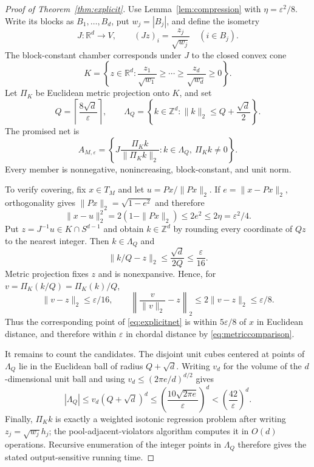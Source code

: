 \documentclass[11pt]{article}
\newcommand{\R}{\mathbb R}
\begin{document}
\begin{proof}[Proof of Theorem~\ref{thm:explicit}]
Use Lemma~\ref{lem:compression} with $\eta=\varepsilon^2/8$.  Write its blocks
as $B_1,\ldots,B_d$, put $w_j=|B_j|$, and define the isometry
\[
 J:\R^d\longrightarrow V,
 \qquad (Jz)_i=\frac{z_j}{\sqrt{w_j}}\quad(i\in B_j).
\]
The block-constant chamber corresponds under $J$ to the closed convex cone
\[
 K=\left\{z\in\R^d:
 \frac{z_1}{\sqrt{w_1}}\geq\cdots\geq
 \frac{z_d}{\sqrt{w_d}}\geq0\right\}.
\]
Let $\Pi_K$ be Euclidean metric projection onto $K$, and set
\[
 Q=\left\lceil\frac{8\sqrt d}{\varepsilon}\right\rceil,
 \qquad
 \Lambda_Q=\left\{k\in\mathbb Z^d:
 \|k\|_2\leq Q+\frac{\sqrt d}{2}\right\}.
\]
The promised net is
\begin{equation}\label{eq:explicitnet}
 A_{M,\varepsilon}
 =\left\{
 J\frac{\Pi_Kk}{\|\Pi_Kk\|_2}:
 k\in\Lambda_Q,\ \Pi_Kk\neq0
 \right\}.
\end{equation}
Every member is nonnegative, nonincreasing, block-constant, and unit norm.

To verify covering, fix $x\in T_M$ and let
$u=Px/\|Px\|_2$.  If $e=\|x-Px\|_2$, orthogonality gives
$\|Px\|_2=\sqrt{1-e^2}$ and therefore
\[
 \|x-u\|_2^2=2(1-\|Px\|_2)\leq2e^2
 \leq2\eta=\varepsilon^2/4.
\]
Put $z=J^{-1}u\in K\cap S^{d-1}$ and obtain
$k\in\mathbb Z^d$ by rounding every coordinate of $Qz$ to the nearest integer.
Then $k\in\Lambda_Q$ and
\[
 \|k/Q-z\|_2\leq\frac{\sqrt d}{2Q}\leq\frac{\varepsilon}{16}.
\]
Metric projection fixes $z$ and is nonexpansive.  Hence, for
$v=\Pi_K(k/Q)=\Pi_K(k)/Q$,
\[
 \|v-z\|_2\leq\varepsilon/16,
 \qquad
 \left\|\frac v{\|v\|_2}-z\right\|_2
 \leq2\|v-z\|_2\leq\varepsilon/8.
\]
Thus the corresponding point of \eqref{eq:explicitnet} is within
$5\varepsilon/8$ of $x$ in Euclidean distance, and therefore within
$\varepsilon$ in chordal distance by \eqref{eq:metriccomparison}.

It remains to count the candidates.  The disjoint unit cubes centered at
points of $\Lambda_Q$ lie in the Euclidean ball of radius $Q+\sqrt d$.
Writing $v_d$ for the volume of the $d$-dimensional unit ball and using
$v_d\leq(2\pi e/d)^{d/2}$ gives
\[
 |\Lambda_Q|
 \leq v_d(Q+\sqrt d)^d
 \leq\left(\frac{10\sqrt{2\pi e}}{\varepsilon}\right)^d
 <\left(\frac{42}{\varepsilon}\right)^d.
\]
Finally, $\Pi_Kk$ is exactly a weighted isotonic regression problem after
writing $z_j=\sqrt{w_j}h_j$; the pool-adjacent-violators algorithm computes it
in $O(d)$ operations.  Recursive enumeration of the integer points in
$\Lambda_Q$ therefore gives the stated output-sensitive running time.
\end{proof}
\end{document}
